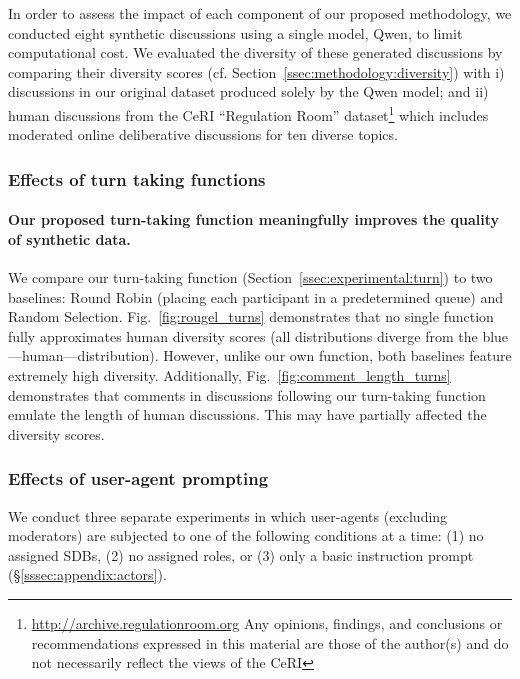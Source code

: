 In order to assess the impact of each component of our proposed methodology, we conducted eight synthetic discussions using a single model, Qwen, to limit computational cost. We evaluated the diversity of these generated discussions by comparing their diversity scores (cf. Section~\ref{ssec:methodology:diversity}) with i) discussions in our original dataset produced solely by the Qwen model; and ii) human discussions from the \ac{CeRI} “Regulation Room” dataset\footnote{\url{http://archive.regulationroom.org} Any opinions, findings, and conclusions or recommendations expressed in this material are those of the author(s) and do not necessarily reflect the views of the \ac{CeRI}} which includes moderated online deliberative discussions for ten diverse topics.


\subsubsection{Effects of turn taking functions}

\paragraph{Our proposed turn-taking function meaningfully improves the quality of synthetic data.} We compare our turn-taking function (Section~\ref{ssec:experimental:turn}) to two baselines: Round Robin (placing each participant in a predetermined queue) and Random Selection. Fig.~\ref{fig:rougel_turns} demonstrates that no single function fully approximates human diversity scores (all distributions diverge from the blue—human—distribution). However, unlike our own function, both baselines feature extremely high diversity. Additionally, Fig.~\ref{fig:comment_length_turns} demonstrates that comments in discussions following our turn-taking function emulate the length of human discussions. This may have partially affected the diversity scores.


\subsubsection{Effects of user-agent prompting}

We conduct three separate experiments in which user-agents (excluding moderators) are subjected to one of the following conditions at a time: (1) no assigned \acp{SDB}, (2) no assigned roles, or (3) only a basic instruction prompt (\S\ref{sssec:appendix:actors}). 

